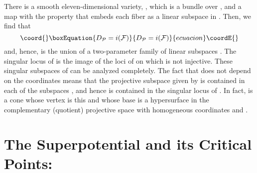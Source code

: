 \documentclass[a4paper,12pt]{article}
\numberwithin{equation}{section}
\theoremstyle{plain}
\begin{document}
There is a smooth
eleven-dimensional variety, \coordHE{}, which is a \coordHE{} bundle over
\coordHE{}, and a map \coordHE{} with the property that \coordHE{} embeds each
\coordHE{} fiber as a linear subspace \coordHE{} in \coordHE{}. Then, we find that
%
\begin{equation}\coord{}\boxEquation{
D_{{\cal{P}}}=i({\cal{F}})
\label{82aa}
}{
D_{{\cal{P}}}=i({\cal{F}})
}{ecuacion}\coordE{}\end{equation}
%
and, hence, \coordHE{} is the union of a two-parameter family of linear
subspaces \coordHE{}.  The singular locus of \coordHE{}
is the image of the loci of \coordHE{} on which \coordHE{} is not
injective. These singular subspaces of \coordHE{} can be analyzed
completely. The fact that \coordHE{} does not depend on the \myHighlight{$\psi$}\coordHE{}
coordinates means that the projective subspace
\coordHE{} given by
\coordHE{} is contained in each of the subspaces \coordHE{}, and hence
\coordHE{} is contained in the singular locus of \coordHE{}. In fact,
\coordHE{} is a cone whose vertex is this \coordHE{} and whose base is
a hypersurface \coordHE{} in the complementary (quotient)
projective space \coordHE{} with homogeneous coordinates \myHighlight{$\phi$}\coordHE{} and \myHighlight{$\chi$}\coordHE{}.



\section{The Superpotential and its Critical Points:}
\end{document}
